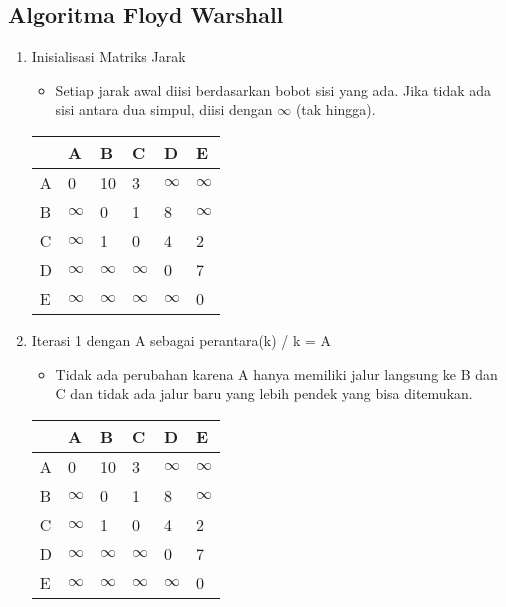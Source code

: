 \subsection{Algoritma Floyd Warshall}
\begin{enumerate}
    \item Inisialisasi Matriks Jarak
    \begin{itemize}
        \item Setiap jarak awal diisi berdasarkan bobot sisi yang ada. Jika tidak ada sisi antara dua simpul, diisi dengan $\infty$ (tak hingga).
    \end{itemize}
    \begin{table}[H]
        \begin{tabular}{|l|l|l|l|l|l|}
        \hline
          & A        & B        & C        & D        & E        \\ \hline
        A & 0        & 10       & 3        & $\infty$ & $\infty$ \\ \hline
        B & $\infty$ & 0        & 1        & 8        & $\infty$ \\ \hline
        C & $\infty$ & 1        & 0        & 4        & 2        \\ \hline
        D & $\infty$ & $\infty$ & $\infty$ & 0        & 7        \\ \hline
        E & $\infty$ & $\infty$ & $\infty$ & $\infty$ & 0        \\ \hline
        \end{tabular}
    \end{table}
    \newpage
    \item Iterasi 1 dengan A sebagai perantara(k) / k = A
    \begin{itemize}
        \item Tidak ada perubahan karena A hanya memiliki jalur langsung ke B dan C dan tidak ada jalur baru yang lebih pendek yang bisa ditemukan.
    \end{itemize}
    \begin{table}[h]
        \begin{tabular}{|l|l|l|l|l|l|}
        \hline
          & A        & B        & C        & D        & E        \\ \hline
        A & 0        & 10       & 3        & $\infty$ & $\infty$ \\ \hline
        B & $\infty$ & 0        & 1        & 8        & $\infty$ \\ \hline
        C & $\infty$ & 1        & 0        & 4        & 2        \\ \hline
        D & $\infty$ & $\infty$ & $\infty$ & 0        & 7        \\ \hline
        E & $\infty$ & $\infty$ & $\infty$ & $\infty$ & 0        \\ \hline
        \end{tabular}
    \end{table}


\end{enumerate}
